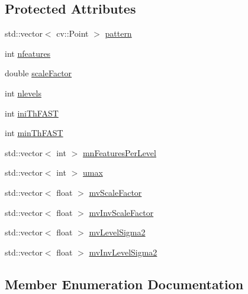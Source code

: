 \subsection*{Protected Attributes}
\begin{DoxyCompactItemize}
\item 
std\+::vector$<$ cv\+::\+Point $>$ \mbox{\hyperlink{class_o_r_b___s_l_a_m2_1_1_o_r_bextractor_a3a2e4f9495adf52773613987f09ae9d9}{pattern}}
\item 
int \mbox{\hyperlink{class_o_r_b___s_l_a_m2_1_1_o_r_bextractor_ab74b569810b3d3288c642cc48fd65c4c}{nfeatures}}
\item 
double \mbox{\hyperlink{class_o_r_b___s_l_a_m2_1_1_o_r_bextractor_a13b9c3883b3fb19cb756f841cb948908}{scale\+Factor}}
\item 
int \mbox{\hyperlink{class_o_r_b___s_l_a_m2_1_1_o_r_bextractor_aaf5c435dfb3fb2220c3847cd5f536e2f}{nlevels}}
\item 
int \mbox{\hyperlink{class_o_r_b___s_l_a_m2_1_1_o_r_bextractor_a8997b404b50b563ffd2aea6b8130dd2a}{ini\+Th\+F\+A\+ST}}
\item 
int \mbox{\hyperlink{class_o_r_b___s_l_a_m2_1_1_o_r_bextractor_a72fcac0df56c0bfe430475082df56823}{min\+Th\+F\+A\+ST}}
\item 
std\+::vector$<$ int $>$ \mbox{\hyperlink{class_o_r_b___s_l_a_m2_1_1_o_r_bextractor_a2eef0343b411bff8681782115a279e2a}{mn\+Features\+Per\+Level}}
\item 
std\+::vector$<$ int $>$ \mbox{\hyperlink{class_o_r_b___s_l_a_m2_1_1_o_r_bextractor_a8c75fd715b20fbaf61fce11e03729901}{umax}}
\item 
std\+::vector$<$ float $>$ \mbox{\hyperlink{class_o_r_b___s_l_a_m2_1_1_o_r_bextractor_a9432037b97eccc06715383d8c34965e9}{mv\+Scale\+Factor}}
\item 
std\+::vector$<$ float $>$ \mbox{\hyperlink{class_o_r_b___s_l_a_m2_1_1_o_r_bextractor_a7eeb10aded635b28fc49422348dc72d0}{mv\+Inv\+Scale\+Factor}}
\item 
std\+::vector$<$ float $>$ \mbox{\hyperlink{class_o_r_b___s_l_a_m2_1_1_o_r_bextractor_a2f9c99c509a4d1408013e91f452ef953}{mv\+Level\+Sigma2}}
\item 
std\+::vector$<$ float $>$ \mbox{\hyperlink{class_o_r_b___s_l_a_m2_1_1_o_r_bextractor_af99de18a5fa2679ff1199f42b9090bf2}{mv\+Inv\+Level\+Sigma2}}
\end{DoxyCompactItemize}


\subsection{Member Enumeration Documentation}
\mbox{\label{class_o_r_b___s_l_a_m2_1_1_o_r_bextractor_a5f326a8b3ba190c121dcdeea1d287f69}} 
